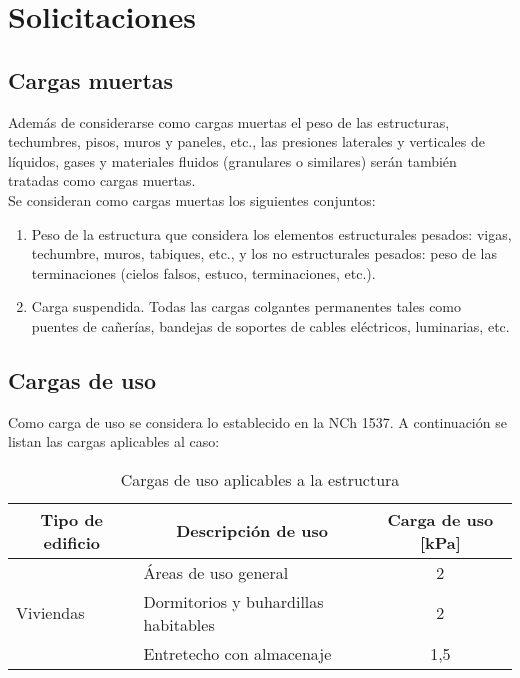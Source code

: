 \section{Solicitaciones}

\subsection{Cargas muertas}

Además de considerarse como cargas muertas el peso de las estructuras, techumbres, pisos, muros y paneles, etc., las presiones laterales y verticales de líquidos, gases y materiales fluidos (granulares o similares) serán también tratadas como cargas muertas. \\
    
Se consideran como cargas muertas los siguientes conjuntos:

\begin{enumerate}[label=\alph*) ]
    \item Peso de la estructura que considera los elementos estructurales pesados: vigas, techumbre, muros, tabiques, etc., y los no estructurales pesados: peso de las terminaciones (cielos falsos, estuco, terminaciones, etc.).
    
    \item Carga suspendida. Todas las cargas colgantes permanentes tales como puentes de cañerías, bandejas de soportes de cables eléctricos, luminarias, etc.

\end{enumerate}

\subsection{Cargas de uso}

Como carga de uso se considera lo establecido en la NCh 1537. A continuación se listan las cargas aplicables al caso:

\begin{table}[H]
  \centering
  \caption{Cargas de uso aplicables a la estructura}
        \begin{tabular}{|l|l|c|}
        \hline
        \multicolumn{1}{|c|}{\textbf{Tipo de edificio}} & \multicolumn{1}{c|}{\textbf{Descripción de uso}} & \multicolumn{1}{p{5.355em}|}{\textbf{Carga de uso [kPa]}} \bigstrut\\
        \hline
        \multirow{4}[2]{*}{Viviendas} & Áreas de uso general & 2 \bigstrut[t]\\
              & Dormitorios y buhardillas habitables & 2 \\
              & Entretecho con almacenaje & 1,5 \bigstrut[b]\\
        \hline
        \end{tabular}%
  \label{carga-uso}%
\end{table}%

